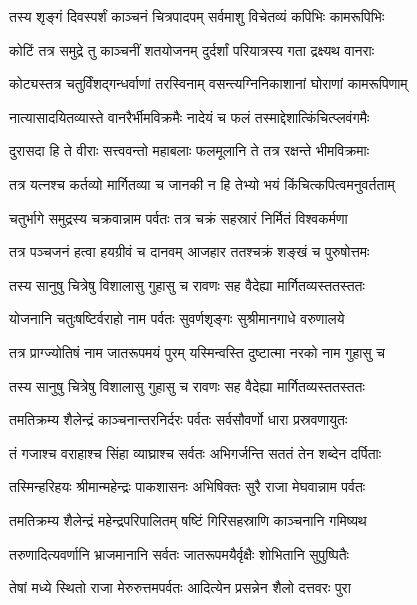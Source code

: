 \twolineshloka
{तस्य शृङ्गं दिवस्पर्शं काञ्चनं चित्रपादपम्}
{सर्वमाशु विचेतव्यं कपिभिः कामरूपिभिः} %

\twolineshloka
{कोटिं तत्र समुद्रे तु काञ्चनीं शतयोजनम्}
{दुर्दर्शां परियात्रस्य गता द्रक्ष्यथ वानराः} %

\twolineshloka
{कोट्यस्तत्र चतुर्विंशद्गन्धर्वाणां तरस्विनाम्}
{वसन्त्यग्निनिकाशानां घोराणां कामरूपिणाम्} %

\twolineshloka
{नात्यासादयितव्यास्ते वानरैर्भीमविक्रमैः}
{नादेयं च फलं तस्माद्देशात्किंचित्प्लवंगमैः} %

\twolineshloka
{दुरासदा हि ते वीराः सत्त्ववन्तो महाबलाः}
{फलमूलानि ते तत्र रक्षन्ते भीमविक्रमाः} %

\twolineshloka
{तत्र यत्नश्च कर्तव्यो मार्गितव्या च जानकी}
{न हि तेभ्यो भयं किंचित्कपित्वमनुवर्तताम्} %

\twolineshloka
{चतुर्भागे समुद्रस्य चक्रवान्नाम पर्वतः}
{तत्र चक्रं सहस्रारं निर्मितं विश्वकर्मणा} %

\twolineshloka
{तत्र पञ्चजनं हत्वा हयग्रीवं च दानवम्}
{आजहार ततश्चक्रं शङ्खं च पुरुषोत्तमः} %

\twolineshloka
{तस्य सानुषु चित्रेषु विशालासु गुहासु च}
{रावणः सह वैदेह्या मार्गितव्यस्ततस्ततः} %

\twolineshloka
{योजनानि चतुःषष्टिर्वराहो नाम पर्वतः}
{सुवर्णशृङ्गः सुश्रीमानगाधे वरुणालये} %

\twolineshloka
{तत्र प्राग्ज्योतिषं नाम जातरूपमयं पुरम्}
{यस्मिन्वस्ति दुष्टात्मा नरको नाम गुहासु च} %

\twolineshloka
{तस्य सानुषु चित्रेषु विशालासु गुहासु च}
{रावणः सह वैदेह्या मार्गितव्यस्ततस्ततः} %

\twolineshloka
{तमतिक्रम्य शैलेन्द्रं काञ्चनान्तरनिर्दरः}
{पर्वतः सर्वसौवर्णो धारा प्रस्रवणायुतः} %

\twolineshloka
{तं गजाश्च वराहाश्च सिंहा व्याघ्राश्च सर्वतः}
{अभिगर्जन्ति सततं तेन शब्देन दर्पिताः} %

\twolineshloka
{तस्मिन्हरिहयः श्रीमान्महेन्द्रः पाकशासनः}
{अभिषिक्तः सुरै राजा मेघवान्नाम पर्वतः} %

\twolineshloka
{तमतिक्रम्य शैलेन्द्रं महेन्द्रपरिपालितम्}
{षष्टिं गिरिसहस्राणि काञ्चनानि गमिष्यथ} %

\twolineshloka
{तरुणादित्यवर्णानि भ्राजमानानि सर्वतः}
{जातरूपमयैर्वृक्षैः शोभितानि सुपुष्पितैः} %

\twolineshloka
{तेषां मध्ये स्थितो राजा मेरुरुत्तमपर्वतः}
{आदित्येन प्रसन्नेन शैलो दत्तवरः पुरा} %

